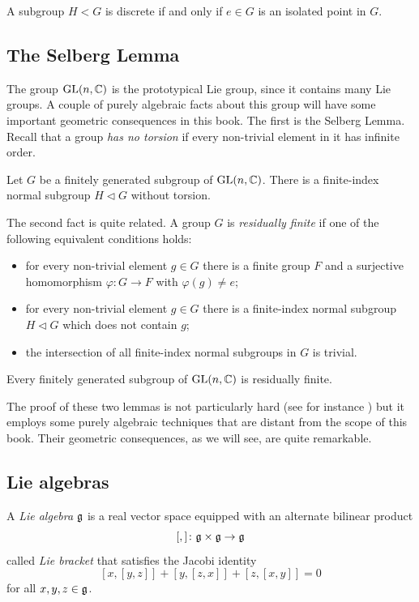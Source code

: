 \begin{ex} \label{isolated:ex}
A subgroup $H<G$ is discrete if and only if $e\in G$ is an isolated point in $G$.
\end{ex}

\subsection{The Selberg Lemma}
The group ${\rm GL}(n,\mathbb{C})$ is the prototypical Lie group, since it contains many Lie groups. A couple of purely algebraic facts about this group will have some important geometric consequences in this book. The first is the Selberg Lemma. Recall that a group \emph{has no torsion} if every non-trivial element in it has infinite order.

\begin{lemma} \label{Selberg:lemma}
 Let $G$ be a finitely generated subgroup of ${\rm GL}(n,\mathbb{C})$. There is a finite-index normal subgroup $H\triangleleft G$ without torsion.
\end{lemma}

The second fact is quite related. A group $G$ is \emph{residually finite} if one of the following equivalent conditions holds:
\begin{itemize}
\item for every non-trivial element $g\in G$ there is a finite group $F$ and a surjective homomorphism $\varphi\colon G \to F$ with $\varphi(g) \neq e$;
\item for every non-trivial element $g \in G$ there is a finite-index normal subgroup $H \triangleleft G$ which does not contain $g$;
\item the intersection of all finite-index normal subgroups in $G$ is trivial. 
\end{itemize}

\begin{lemma} \label{RF:lemma}
Every finitely generated subgroup of ${\rm GL}(n,\mathbb{C})$ is residually finite.
\end{lemma}

The proof of these two lemmas is not particularly hard (see for instance \cite[Chapter 7.6]{R}) but it employs some purely algebraic techniques that are distant from the scope of this book. Their geometric consequences, as we will see, are quite remarkable.

\subsection{Lie algebras}
A \emph{Lie algebra} $\mathfrak{g}$ is a real vector space equipped with an alternate bilinear product 
$$[,] \colon \mathfrak{g} \times \mathfrak{g} \to \mathfrak{g}$$ 
called \emph{Lie bracket} that satisfies the Jacobi identity
$$[x,[y,z]]+[y,[z,x]] + [z,[x,y]]=0$$
for all $x,y,z \in \mathfrak{g}$. 

